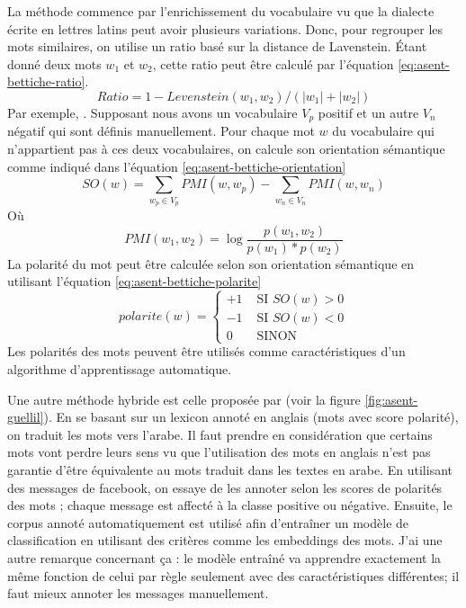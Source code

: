 \documentclass{KodeBook}
\begin{document}
La méthode commence par l'enrichissement du vocabulaire vu que la dialecte écrite en lettres latins peut avoir plusieurs variations. 
Donc, pour regrouper les mots similaires, on utilise un ratio basé sur la distance de Lavenstein. 
Étant donné deux mots $w_1$ et $w_2$, cette ratio peut être calculé par l'équation \ref{eq:asent-bettiche-ratio}.
\begin{equation}\label{eq:asent-bettiche-ratio}
Ratio = 1 - Levenstein(w_1, w_2)/(|w_1|+|w_2|)
\end{equation}
Par exemple, .
Supposant nous avons un vocabulaire $V_p$ positif et un autre $V_n$ négatif qui sont définis manuellement. 
Pour chaque mot $w$ du vocabulaire qui n'appartient pas à ces deux vocabulaires, on calcule son orientation sémantique comme indiqué dans l'équation \ref{eq:asent-bettiche-orientation}
\begin{equation}\label{eq:asent-bettiche-orientation}
SO(w) = \sum_{w_p \in V_p} PMI(w, w_p) - \sum_{w_n \in V_n} PMI(w, w_n)
\end{equation}
Où
\[PMI (w_1, w_2) = \log \frac{p(w_1, w_2)}{p(w_1)*p(w_2)}\]
La polarité du mot peut être calculée selon son orientation sémantique en utilisant l'équation \ref{eq:asent-bettiche-polarite}
\begin{equation}\label{eq:asent-bettiche-polarite}
polarite(w) = \begin{cases}
 +1 & \text{ SI } SO(w) > 0\\
-1 & \text{ SI } SO(w) < 0 \\
0   &\text{ SINON }
\end{cases}
\end{equation}
Les polarités des mots peuvent être utilisés comme caractéristiques d'un algorithme d'apprentissage automatique.

Une autre méthode hybride est celle proposée par \citet{18-guellil-al} (voir la figure \ref{fig:asent-guellil}).
En se basant sur un lexicon annoté en anglais (mots avec score polarité), on traduit les mots vers l'arabe. 
Il faut prendre en considération que certains mots vont perdre leurs sens vu que l'utilisation des mots en anglais n'est pas garantie d'être équivalente au mots traduit dans les textes en arabe. 
En utilisant des messages de facebook, on essaye de les annoter selon les scores de polarités des mots ; chaque message est affecté à la classe positive ou négative.
Ensuite, le corpus annoté automatiquement est utilisé afin d'entraîner un modèle de classification en utilisant des critères comme les embeddings des mots. 
J'ai une autre remarque concernant ça : le modèle entraîné va apprendre exactement la même fonction de celui par règle seulement avec des caractéristiques différentes; il faut mieux annoter les messages manuellement.
\end{document}
